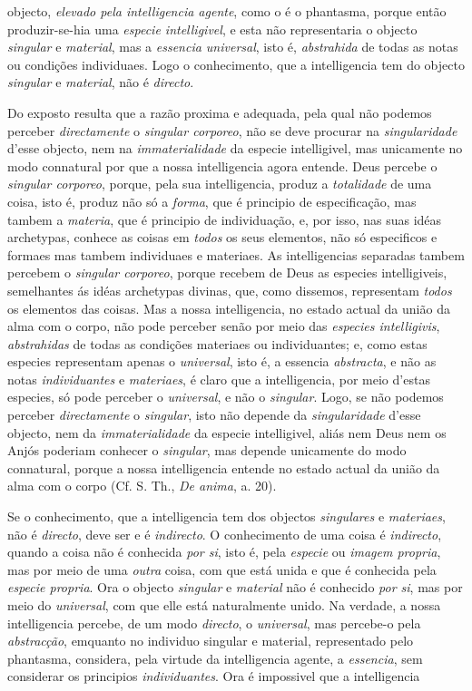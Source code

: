objecto, \emph{elevado pela intelligencia agente}, como o é o phantasma, porque então produzir-se-hia uma \emph{especie intelligivel}, e esta não representaria o objecto \emph{singular} e \emph{material}, mas a \emph{essencia universal}, isto é, \emph{abstrahida} de todas as notas ou condições individuaes. Logo o conhecimento, que a intelligencia tem do objecto \emph{singular} e \emph{material}, não é \emph{directo}.\par Do exposto resulta que a razão proxima e adequada, pela qual não podemos perceber \emph{directamente} o \emph{singular corporeo}, não se deve procurar na \emph{singularidade} d'esse objecto, nem na \emph{immaterialidade} da especie intelligivel, mas unicamente no modo connatural por que a nossa intelligencia agora entende. Deus percebe o \emph{singular corporeo}, porque, pela sua intelligencia, produz a \emph{totalidade} de uma coisa, isto é, produz não só a \emph{forma}, que é principio de especificação, mas tambem a \emph{materia}, que é principio de individuação, e, por isso, nas suas idéas archetypas, conhece as coisas em \emph{todos} os seus elementos, não só especificos e formaes mas tambem individuaes e materiaes. As intelligencias separadas tambem percebem o \emph{singular corporeo}, porque recebem de Deus as especies intelligiveis, semelhantes ás idéas archetypas divinas, que, como dissemos, representam \emph{todos} os elementos das coisas. Mas a nossa intelligencia, no estado actual da união da alma com o corpo, não pode perceber senão por meio das \emph{especies intelligivis}, \emph{abstrahidas} de todas as condições materiaes ou individuantes; e, como estas especies representam apenas o \emph{universal}, isto é, a essencia \emph{abstracta}, e não as notas \emph{individuantes} e \emph{materiaes}, é claro que a intelligencia, por meio d'estas especies, só pode perceber o \emph{universal}, e não o \emph{singular}. Logo, se não podemos perceber \emph{directamente} o \emph{singular}, isto não depende da \emph{singularidade} d'esse objecto, nem da \emph{immaterialidade} da especie intelligivel, aliás nem Deus nem os Anjós poderiam conhecer o \emph{singular}, mas depende unicamente do modo connatural, porque a nossa intelligencia entende no estado actual da união da alma com o corpo (Cf. S. Th., \emph{De anima}, a. 20).\par Se o conhecimento, que a intelligencia tem dos objectos \emph{singulares} e \emph{materiaes}, não é \emph{directo}, deve ser e é \emph{indirecto}. O conhecimento de uma coisa é \emph{indirecto}, quando a coisa não é conhecida \emph{por si}, isto é, pela \emph{especie} ou \emph{imagem propria}, mas por meio de uma \emph{outra} coisa, com que está unida e que é conhecida pela \emph{especie propria}. Ora o objecto \emph{singular} e \emph{material} não é conhecido \emph{por si}, mas por meio do \emph{universal}, com que elle está naturalmente unido. Na verdade, a nossa intelligencia percebe, de um modo \emph{directo}, o \emph{universal}, mas percebe-o pela \emph{abstracção}, emquanto no individuo singular e material, representado pelo phantasma, considera, pela virtude da intelligencia agente, a \emph{essencia}, sem considerar os principios \emph{individuantes}. Ora é impossivel que a intelligencia 